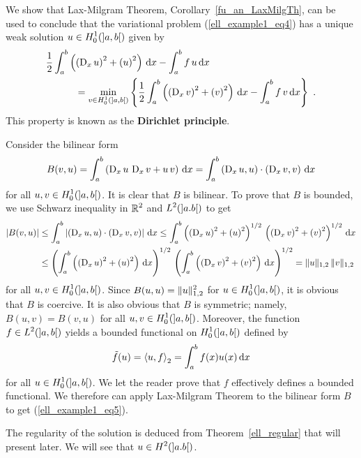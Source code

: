 \begin{egg}
We show that Lax-Milgram Theorem, Corollary~\ref{fu_an_LaxMilgTh}, can
be used to conclude that the variational problem
(\ref{ell_example1_eq4}) has a unique weak solution
$\displaystyle u \in H^1_0(]a,b[)$ given by
\begin{equation} \label{ell_example1_eq5}
\begin{split}
&\frac{1}{2} \int_a^b \left( \left(\operatorname{D}_x u\right)^2 +
\left(u\right)^2\right) \,\mathrm{d}{x} - \int_a^b f\, u \,\mathrm{d}{x}\\
&\qquad \quad = \min_{v \in H^1_0(]a,b[)} \left\{
\frac{1}{2} \int_a^b \left( \left(\operatorname{D}_x v\right)^2 +
\left(v\right)^2\right) \,\mathrm{d}{x} - \int_a^b f\, v \,\mathrm{d}{x} \right\} \ .
\end{split}
\end{equation}
This property is known as the {\bfseries Dirichlet principle}.

Consider the bilinear form
\[
B(v,u) = \int_a^b \left( \operatorname{D}_x u\, \operatorname{D}_x v + u \, v \right) \,\mathrm{d}{x}
= \int_a^b \left( \operatorname{D}_x u, u\right)\cdot\left(\operatorname{D}_x v,v \right) \,\mathrm{d}{x}
\]
for all $\displaystyle u,v \in H^1_0(]a,b[)$.
It is clear that $B$ is bilinear.  To prove that $B$ is
bounded, we use Schwarz inequality in $\displaystyle \mathbb{R}^2$ and
$\displaystyle L^2(]a.b[)$ to get
\begin{align*}
|B(v,u)| &\leq \int_a^b \left| \left( \operatorname{D}_x u, u\right) \cdot
\left(\operatorname{D}_x v, v \right) \right| \,\mathrm{d}{x}
\leq \int_a^b \left(\left( \operatorname{D}_x u\right)^2
+\left(u\right)^2\right)^{1/2} \, \left(\left( \operatorname{D}_x v\right)^2
+\left(v\right)^2\right)^{1/2} \,\mathrm{d}{x} \\
&\leq \left( \int_a^b \left(\left( \operatorname{D}_x u\right)^2
+\left(u\right)^2\right) \,\mathrm{d}{x} \right)^{1/2} \,
\left( \int_a^b \left(\left(\operatorname{D}_x v\right)^2
+\left(v\right)^2\right) \,\mathrm{d}{x} \right)^{1/2}
= \| u\|_{1,2} \, \|v\|_{1,2}
\end{align*}
for all $\displaystyle u,v \in H^1_0(]a,b[)$.
Since $\displaystyle B(u,u) = \|u\|_{1,2}^2$ for
$\displaystyle u\in H^1_0(]a,b[)$, it is obvious
that $B$ is coercive.  It is also obvious that $B$ is
symmetric; namely, $B(u,v)=B(v,u)$ for all $\displaystyle u,v \in H^1_0(]a,b[)$.
Moreover, the function $\displaystyle f \in L^2(]a,b[)$ yields a
bounded functional on $\displaystyle H^1_0(]a,b[)$ defined by
\[
\tilde{f}(u) = \left\langle{u} , {f}\right\rangle_2 = \int_a^b f(x)u(x)\,\mathrm{d}{x}
\]
for all $\displaystyle u \in H^1_0(]a,b[)$.
We let the reader prove that $f$ effectively defines a bounded
functional.  We therefore can apply Lax-Milgram Theorem to the
bilinear form $B$ to get (\ref{ell_example1_eq5}).

The regularity of the solution is deduced from
Theorem~\ref{ell_regular} that will present later.  We will see
that $\displaystyle u\in H^2(]a.b[)$.


\end{egg}
